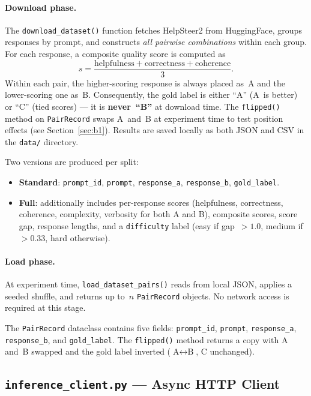 \documentclass[11pt,a4paper]{article}
\begin{document}
\paragraph{Download phase.}
The \texttt{download\_dataset()} function fetches HelpSteer2 from HuggingFace,
groups responses by prompt, and constructs \emph{all pairwise combinations}
within each group. For each response, a composite quality score is computed as
\[
  s = \frac{\text{helpfulness} + \text{correctness} + \text{coherence}}{3}.
\]
Within each pair, the higher-scoring response is always placed as~A and the
lower-scoring one as~B. Consequently, the gold label is either ``A''
(A~is better) or ``C'' (tied scores) --- it is \textbf{never~``B''} at
download time. The \texttt{flipped()} method on \texttt{PairRecord} swaps
A~and~B at experiment time to test position effects (see Section~\ref{sec:b1}).
Results are saved locally as both JSON and CSV in the \texttt{data/} directory.

Two versions are produced per split:
\begin{itemize}[nosep]
  \item \textbf{Standard}: \texttt{prompt\_id}, \texttt{prompt},
        \texttt{response\_a}, \texttt{response\_b}, \texttt{gold\_label}.
  \item \textbf{Full}: additionally includes per-response scores
        (helpfulness, correctness, coherence, complexity, verbosity for
        both A and B), composite scores, score gap, response lengths, and
        a \texttt{difficulty} label (easy if gap~$> 1.0$, medium if~$> 0.33$,
        hard otherwise).
\end{itemize}

\paragraph{Load phase.}
At experiment time, \texttt{load\_dataset\_pairs()} reads from local JSON,
applies a seeded shuffle, and returns up to~$n$ \texttt{PairRecord} objects.
No network access is required at this stage.

The \texttt{PairRecord} dataclass contains five fields: \texttt{prompt\_id},
\texttt{prompt}, \texttt{response\_a}, \texttt{response\_b}, and
\texttt{gold\_label}. The \texttt{flipped()} method returns a copy with
A and~B swapped and the gold label inverted
($\text{A} \leftrightarrow \text{B}$, $\text{C}$ unchanged).


\subsection{\texttt{inference\_client.py} --- Async HTTP Client}
\end{document}
